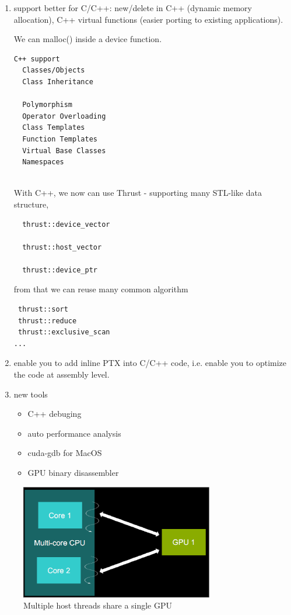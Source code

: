 \begin{enumerate}
  \item support better for C/C++: new/delete in C++ (dynamic memory allocation), C++ virtual functions
  (easier porting to existing applications). 
  
  We can malloc() inside a device function.
  
  \begin{verbatim}
C++ support
  Classes/Objects
  Class Inheritance 
  
  Polymorphism 
  Operator Overloading 
  Class Templates 
  Function Templates 
  Virtual Base Classes 
  Namespaces


  \end{verbatim}
  
  With C++, we now can use Thrust - supporting many STL-like data structure, 
  \begin{verbatim}
  thrust::device_vector
  
  thrust::host_vector
  
  thrust::device_ptr
  \end{verbatim}
  from that we can reuse many common algorithm
  \begin{verbatim}
 thrust::sort
 thrust::reduce
 thrust::exclusive_scan
...
  \end{verbatim}
  
  \item enable you to add inline PTX into C/C++ code, i.e. enable you to
  optimize the code at assembly level.
  
  \item new tools
  
  \begin{itemize}
    \item C++ debuging
  
    \item auto performance analysis
  
    \item cuda-gdb for MacOS
  
    \item GPU binary disassembler
  \end{itemize}
\end{enumerate}

\begin{figure}[hbt]
  \centerline{\includegraphics[height=5cm,angle=0]{./images/ABC.eps}}
\caption{Multiple host threads share a single GPU}
\label{fig:hostthread-GPU2}
\end{figure}

